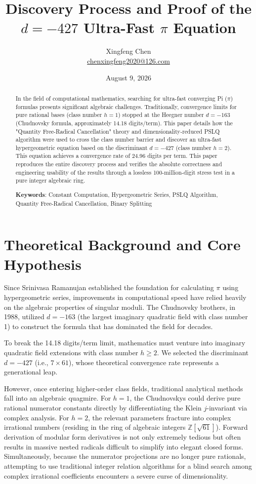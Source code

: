 \documentclass[11pt,a4paper]{article}
\title{Discovery Process and Proof of the $d=-427$ Ultra-Fast $\pi$ Equation}
\author{Xingfeng Chen \\ \href{mailto:chenxingfeng2020@126.com}{chenxingfeng2020@126.com}}
\date{August 9, 2026}
\begin{document}
\maketitle

\begin{abstract}
In the field of computational mathematics, searching for ultra-fast converging Pi ($\pi$) formulas presents significant algebraic challenges. Traditionally, convergence limits for pure rational bases (class number $h=1$) stopped at the Heegner number $d=-163$ (Chudnovsky formula, approximately 14.18 digits/term). This paper details how the "Quantity Free-Radical Cancellation" theory and dimensionality-reduced PSLQ algorithm were used to cross the class number barrier and discover an ultra-fast hypergeometric equation based on the discriminant $d=-427$ (class number $h=2$). This equation achieves a convergence rate of 24.96 digits per term. This paper reproduces the entire discovery process and verifies the absolute correctness and engineering usability of the results through a lossless 100-million-digit stress test in a pure integer algebraic ring.

\textbf{Keywords}: Constant Computation, Hypergeometric Series, PSLQ Algorithm, Quantity Free-Radical Cancellation, Binary Splitting
\end{abstract}

\section{Theoretical Background and Core Hypothesis}

Since Srinivasa Ramanujan established the foundation for calculating $\pi$ using hypergeometric series, improvements in computational speed have relied heavily on the algebraic properties of singular moduli. The Chudnovsky brothers, in 1988, utilized $d=-163$ (the largest imaginary quadratic field with class number 1) to construct the formula that has dominated the field for decades.

To break the 14.18 digits/term limit, mathematics must venture into imaginary quadratic field extensions with class number $h \ge 2$. We selected the discriminant $d=-427$ (i.e., $7 \times 61$), whose theoretical convergence rate represents a generational leap.

However, once entering higher-order class fields, traditional analytical methods fall into an algebraic quagmire. For $h=1$, the Chudnovskys could derive pure rational numerator constants directly by differentiating the Klein $j$-invariant via complex analysis. For $h=2$, the relevant parameters fracture into complex irrational numbers (residing in the ring of algebraic integers $\mathbb{Z}[\sqrt{61}]$). Forward derivation of modular form derivatives is not only extremely tedious but often results in massive nested radicals difficult to simplify into elegant closed forms. Simultaneously, because the numerator projections are no longer pure rationals, attempting to use traditional integer relation algorithms for a blind search among complex irrational coefficients encounters a severe curse of dimensionality.
\end{document}
